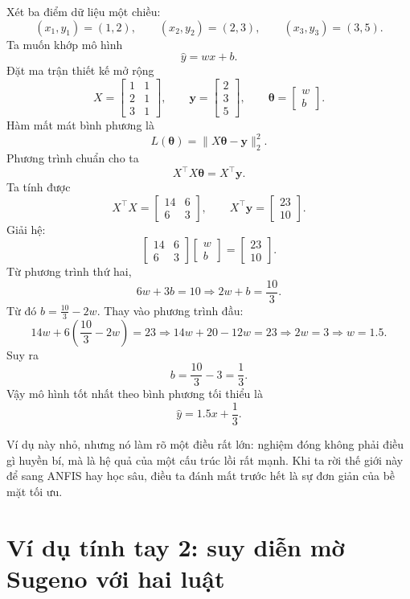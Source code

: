 Xét ba điểm dữ liệu một chiều:
\[
(x_1,y_1)=(1,2),\qquad (x_2,y_2)=(2,3),\qquad (x_3,y_3)=(3,5).
\]
Ta muốn khớp mô hình
\[
\hat{y}=wx+b.
\]
Đặt ma trận thiết kế mở rộng
\[
X=
\begin{bmatrix}
1 & 1\\
2 & 1\\
3 & 1
\end{bmatrix},
\qquad
\bm{y}=
\begin{bmatrix}
2\\3\\5
\end{bmatrix},
\qquad
\bm{\theta}=
\begin{bmatrix}
w\\b
\end{bmatrix}.
\]
Hàm mất mát bình phương là
\[
L(\bm{\theta})=\|X\bm{\theta}-\bm{y}\|_2^2.
\]
Phương trình chuẩn cho ta
\[
X^\top X\bm{\theta}=X^\top \bm{y}.
\]
Ta tính được
\[
X^\top X=
\begin{bmatrix}
14 & 6\\
6 & 3
\end{bmatrix},
\qquad
X^\top \bm{y}=
\begin{bmatrix}
23\\
10
\end{bmatrix}.
\]
Giải hệ:
\[
\begin{bmatrix}
14 & 6\\
6 & 3
\end{bmatrix}
\begin{bmatrix}
w\\b
\end{bmatrix}
=
\begin{bmatrix}
23\\10
\end{bmatrix}.
\]
Từ phương trình thứ hai,
\[
6w+3b=10 \Longrightarrow 2w+b=\frac{10}{3}.
\]
Từ đó \(b=\frac{10}{3}-2w\). Thay vào phương trình đầu:
\[
14w+6\left(\frac{10}{3}-2w\right)=23
\Longrightarrow 14w+20-12w=23
\Longrightarrow 2w=3
\Longrightarrow w=1.5.
\]
Suy ra
\[
b=\frac{10}{3}-3=\frac{1}{3}.
\]
Vậy mô hình tốt nhất theo bình phương tối thiểu là
\[
\hat{y}=1.5x+\frac{1}{3}.
\]

Ví dụ này nhỏ, nhưng nó làm rõ một điều rất lớn: nghiệm đóng không phải điều gì huyền bí, mà là hệ quả của một cấu trúc lồi rất mạnh. Khi ta rời thế giới này để sang ANFIS hay học sâu, điều ta đánh mất trước hết là sự đơn giản của bề mặt tối ưu.

\section{Ví dụ tính tay 2: suy diễn mờ Sugeno với hai luật}

